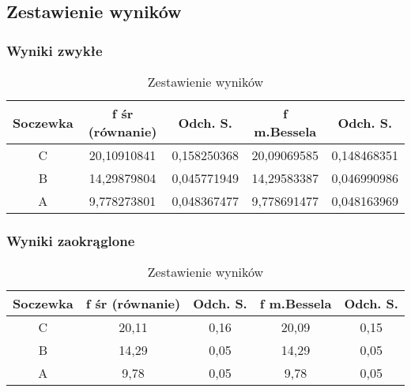 \documentclass[polish,a4paper]{article}
\begin{document}
\subsection{Zestawienie wyników}
\subsubsection{Wyniki zwykłe}
\begin{table}[H]
\centering
\begin{tabular}{|c|c|c|c|c|}
\hline
Soczewka &  f śr (równanie) &  Odch. S. &  f m.Bessela &  Odch. S. \\
\hline
C &  20,10910841 &  0,158250368 &  20,09069585 &  0,148468351 \\
B &  14,29879804 &  0,045771949 &  14,29583387 &  0,046990986 \\
A &  9,778273801 &  0,048367477 &  9,778691477 &  0,048163969 \\
\hline
\end{tabular}
\caption{Zestawienie wyników}
\end{table}
\subsubsection{Wyniki zaokrąglone} 
\begin{table}[H]
\centering
\begin{tabular}{|c|c|c|c|c|}
\hline
Soczewka &  f śr (równanie) &  Odch. S. &  f m.Bessela &  Odch. S. \\
\hline
C &  20,11 &  0,16 &  20,09 &  0,15 \\
B &  14,29 &  0,05 &  14,29 &  0,05 \\
A &  9,78 &  0,05 &  9,78 &  0,05 \\
\hline
\end{tabular}
\caption{Zestawienie wyników}
\end{table}
\end{document}
